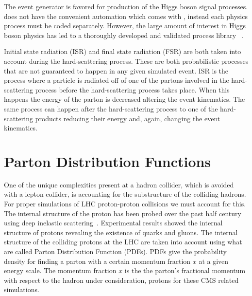 The \POWHEG event generator is favored for production of the Higgs boson signal processes.
\POWHEG does not have the convenient automation which comes with \MGAMCNLO, instead each
physics process must be coded separately. However, the large amount of interest in Higgs boson physics
has led to a thoroughly developed and validated process library 
~\cite{Alioli:2010xa,Alioli:2008tz,Brein:2003wg,Ravindran:2003um,deFlorian:2012mx}.

Initial state radiation (ISR) and final state radiation (FSR) are both taken into account
during the hard-scattering process. These are both probabilistic processes that are not 
guaranteed to happen in any given simulated event. 
ISR is the process where a particle is radiated off of
one of the partons involved in the hard-scattering process before the hard-scattering process
takes place. When this happens the energy of the parton is decreased altering the event
kinematics. The same process can happen after the hard-scattering process to one of the
hard-scattering products reducing their energy and, again, changing the event kinematics.



\section{Parton Distribution Functions}
One of the unique complexities present at a hadron collider, which is avoided with a
lepton collider, is accounting for the substructure of the colliding hadrons. For proper simulations
of LHC proton-proton collisions we must account for this. The internal structure of the proton
has been probed over the past half century using deep inelastic scattering~\cite{Breidenbach:1969kd, PhysRevLett.23.930}.
Experimental results showed the internal structure of protons revealing the existence of
quarks and gluons. The internal structure of the colliding protons at the LHC are taken into
account using what are called Parton Distribution Function (PDFs). PDFs give the probability
density for finding a parton with a certain momentum fraction $x$ at a given
energy scale. The momentum fraction $x$ is the the parton's fractional momentum with respect
to the hadron under consideration, protons for these CMS related simulations. 

